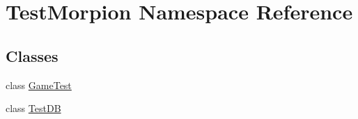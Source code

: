 \hypertarget{namespace_test_morpion}{}\section{Test\+Morpion Namespace Reference}
\label{namespace_test_morpion}
\subsection*{Classes}
\begin{DoxyCompactItemize}
\item 
class \hyperlink{class_test_morpion_1_1_game_test}{Game\+Test}
\item 
class \hyperlink{class_test_morpion_1_1_test_d_b}{Test\+DB}
\end{DoxyCompactItemize}
